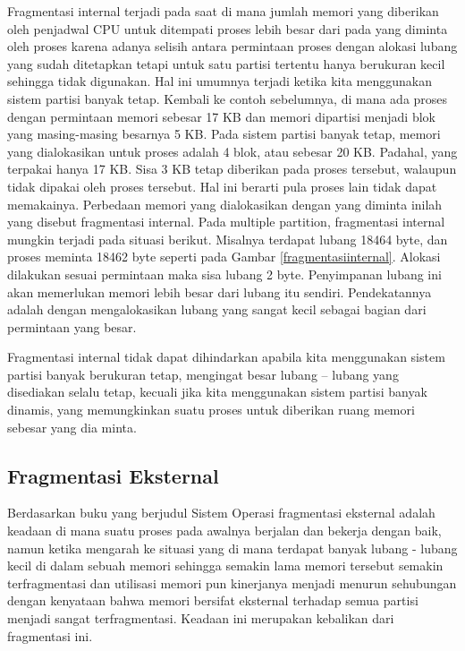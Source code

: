 Fragmentasi internal terjadi pada saat di mana jumlah memori yang diberikan oleh penjadwal CPU untuk ditempati proses lebih besar dari pada yang diminta oleh proses karena adanya selisih antara permintaan proses dengan alokasi lubang yang sudah ditetapkan tetapi untuk satu partisi tertentu hanya berukuran kecil sehingga tidak digunakan.
Hal ini umumnya terjadi ketika kita menggunakan sistem partisi banyak tetap. Kembali ke contoh sebelumnya, di mana ada proses dengan permintaan memori sebesar 17 KB dan memori dipartisi menjadi blok yang masing-masing besarnya 5 KB. Pada sistem partisi banyak tetap, memori yang dialokasikan untuk proses adalah 4 blok, atau sebesar 20 KB. Padahal, yang terpakai hanya 17 KB. Sisa 3 KB tetap diberikan pada proses tersebut, walaupun tidak dipakai oleh proses tersebut. Hal ini berarti pula proses lain tidak dapat memakainya. Perbedaan memori yang dialokasikan dengan yang diminta inilah yang disebut fragmentasi internal. Pada multiple partition, fragmentasi internal mungkin terjadi pada situasi berikut. Misalnya terdapat lubang 18464 byte, dan proses meminta 18462 byte seperti pada Gambar \ref{fragmentasiinternal}. Alokasi dilakukan sesuai permintaan maka sisa lubang 2 byte. Penyimpanan lubang ini akan memerlukan memori lebih besar dari lubang itu sendiri. Pendekatannya adalah dengan mengalokasikan lubang yang sangat kecil sebagai bagian dari permintaan yang besar.

Fragmentasi internal tidak dapat dihindarkan apabila kita menggunakan sistem partisi banyak berukuran tetap, mengingat besar lubang – lubang yang disediakan selalu tetap, kecuali jika kita menggunakan sistem partisi banyak dinamis, yang memungkinkan suatu proses untuk diberikan ruang memori sebesar yang dia minta.

\subsection{Fragmentasi Eksternal}
Berdasarkan buku yang berjudul Sistem Operasi \cite{pangera2005sistem} fragmentasi eksternal adalah keadaan di mana suatu proses pada awalnya berjalan dan bekerja dengan baik, namun ketika mengarah ke situasi yang di mana terdapat banyak lubang - lubang kecil di dalam sebuah memori sehingga semakin lama memori tersebut semakin terfragmentasi dan utilisasi memori pun kinerjanya menjadi menurun sehubungan dengan kenyataan bahwa memori bersifat eksternal terhadap semua partisi menjadi sangat terfragmentasi. Keadaan ini merupakan kebalikan dari fragmentasi ini.

